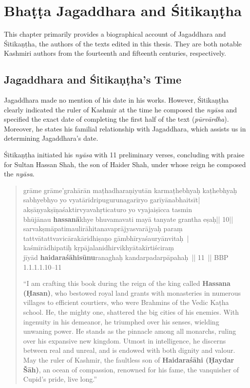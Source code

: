 \chapter{Bhaṭṭa Jagaddhara and Śitikaṇṭha}

This chapter primarily provides a biographical account of Jagaddhara and Śitikaṇṭha, the authors of the texts edited in this thesis. They are both notable Kashmiri authors from the fourteenth and fifteenth centuries, respectively.

\section{Jagaddhara and Śitikaṇṭha's Time}

Jagaddhara made no mention of his date in his works. However, Śitikaṇṭha clearly indicated the ruler of Kashmir at the time he composed the \emph{nyāsa} and specified the exact date of completing the first half of the text (\emph{pūrvārdha}). Moreover, he states his familial relationship with Jagaddhara, which assists us in determining Jagaddhara's date.

Śitikaṇṭha initiated his \emph{nyāsa} with 11 preliminary verses, concluding with praise for Sultan Hassan Shah, the son of Haider Shah, under whose reign he composed the \emph{nyāsa}.

\begin{quote}	
	\textsanskrit{grāme grāme'grahārān maṭhadharaṇiyutān karmaṭhebhyaḥ kaṭhebhyaḥ\\
	sabhyebhyo yo vyatārīdripugurunagarīryo garīyānabhaitsīt|\\
	akṣāṇyakṣīṇaśaktirvyavahṛticaturo yo vyajaiṣīcca tasmin\\
	bhūjānau \textbf{hassanā}khye bhuvamavati mayā tanyate grantha eṣaḥ|| 10||\\
	sarvakṣmāpatimaulirāhitanavaprājyasvarājyaḥ paraṃ\\
	tattvātattvavicārakāridhiṣaṇo gāmbhīryaśauryānvitaḥ |\\	
	kaśmīrādhipatiḥ kṛpājalanidhirvikhyātakīrtiściraṃ\\
	jīyād \textbf{haidaraśāhisūnu}ranaghaḥ kandarpadarpāpahaḥ || 11 ||}
	BBP 1.1.1.1.10--11
	

	“I am crafting this book during the reign of the king called \textbf{Hassana (Ḥasan)}, who bestowed royal land grants with monasteries in numerous villages to efficient courtiers, who were Brahmins of the Vedic Kaṭha school. He, the mighty one, shattered the big cities of his enemies. With ingenuity in his demeanor, he triumphed over his senses, wielding unwaning power. He stands as the pinnacle among all monarchs, ruling over his expansive new kingdom. Utmost in intelligence, he discerns between real and unreal, and is endowed with both dignity and valour. May the ruler of Kashmir, the faultless son of \textbf{Haidaraśāhi (Ḥaydar Šāh)}, an ocean of compassion, renowned for his fame, the vanquisher of Cupid's pride, live long.”	
\end{quote}

